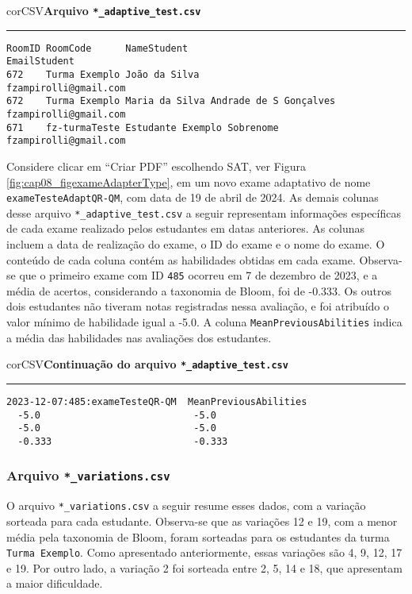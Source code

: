 \begin{myboxCode}{corCSV}{\textbf{Arquivo \texttt{*\_adaptive\_test.csv}}}\vspace{3mm}
\hrule
\begin{verbatim}
RoomID RoomCode      NameStudent                           EmailStudent
672    Turma Exemplo João da Silva                         fzampirolli@gmail.com 
672    Turma Exemplo Maria da Silva Andrade de S Gonçalves fzampirolli@gmail.com    
671    fz-turmaTeste Estudante Exemplo Sobrenome           fzampirolli@gmail.com 
\end{verbatim}
\end{myboxCode}

Considere clicar em ``Criar PDF'' escolhendo SAT, ver Figura \ref{fig:cap08_figexameAdapterType}, em um novo exame adaptativo de nome \verb|exameTesteAdaptQR-QM|, com data de 19 de abril de 2024. As demais colunas desse arquivo \verb|*_adaptive_test.csv| a seguir representam informações específicas de cada exame realizado pelos estudantes em datas anteriores. As colunas incluem a data de realização do exame, o ID do exame e o nome do exame. O conteúdo de cada coluna contém as habilidades obtidas em cada exame. Observa-se que o primeiro exame com ID \verb|485| ocorreu em 7 de dezembro de 2023, e a média de acertos, considerando a taxonomia de Bloom, foi de -0.333. Os outros dois estudantes não tiveram notas registradas nessa avaliação, e foi atribuído o valor mínimo de habilidade igual a -5.0. A coluna \verb|MeanPreviousAbilities| indica a média das habilidades nas avaliações dos estudantes.

\begin{myboxCode}{corCSV}{\textbf{Continuação do arquivo \texttt{*\_adaptive\_test.csv}}}\vspace{3mm}
  \hrule
  \begin{verbatim}
2023-12-07:485:exameTesteQR-QM  MeanPreviousAbilities
  -5.0                           -5.0 
  -5.0                           -5.0 
  -0.333                         -0.333
\end{verbatim}
\end{myboxCode}

\subsubsection{Arquivo \texttt{*\_variations.csv}}\label{sec:variations}

O arquivo \verb|*_variations.csv| a seguir resume esses dados, com a variação sorteada para cada estudante. Observa-se que as variações 12 e 19, com a menor média pela taxonomia de Bloom, foram sorteadas para os estudantes da turma \verb|Turma Exemplo|. Como apresentado anteriormente, essas variações são 4, 9, 12, 17 e 19. Por outro lado, a variação 2 foi sorteada entre 2, 5, 14 e 18, que apresentam a maior dificuldade.

